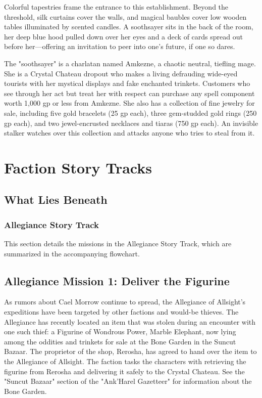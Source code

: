 \documentclass[10pt,a4paper,twoside,bg=print,twocolumn,openany,nodeprecatedcode]{dndbook}
\begin{document}
Colorful tapestries frame the entrance to this establishment. Beyond the threshold, silk curtains cover the walls, and magical baubles cover low wooden tables illuminated by scented candles. A soothsayer sits in the back of the room, her deep blue hood pulled down over her eyes and a deck of cards spread out before her—offering an invitation to peer into one's future, if one so dares.

The "soothsayer" is a charlatan named Amkezne, a chaotic neutral, tiefling mage. She is a Crystal Chateau dropout who makes a living defrauding wide-eyed tourists with her mystical displays and fake enchanted trinkets. Customers who see through her act but treat her with respect can purchase any spell component worth 1,000 gp or less from Amkezne. She also has a collection of fine jewelry for sale, including five gold bracelets (25 gp each), three gem-studded gold rings (250 gp each), and two jewel-encrusted necklaces and tiaras (750 gp each). An invisible stalker watches over this collection and attacks anyone who tries to steal from it.



\section{Faction Story Tracks}

\subsection{What Lies Beneath}
\subsubsection{Allegiance Story Track}
This section details the missions in the Allegiance Story Track, which are summarized in the accompanying flowchart.

\subsection{Allegiance Mission 1: Deliver the Figurine}
As rumors about Cael Morrow continue to spread, the Allegiance of Allsight's expeditions have been targeted by other factions and would-be thieves. The Allegiance has recently located an item that was stolen during an encounter with one such thief: a Figurine of Wondrous Power, Marble Elephant, now lying among the oddities and trinkets for sale at the Bone Garden in the Suncut Bazaar. The proprietor of the shop, Rerosha, has agreed to hand over the item to the Allegiance of Allsight. The faction tasks the characters with retrieving the figurine from Rerosha and delivering it safely to the Crystal Chateau. See the "Suncut Bazaar" section of the "Ank'Harel Gazetteer" for information about the Bone Garden.
\end{document}
